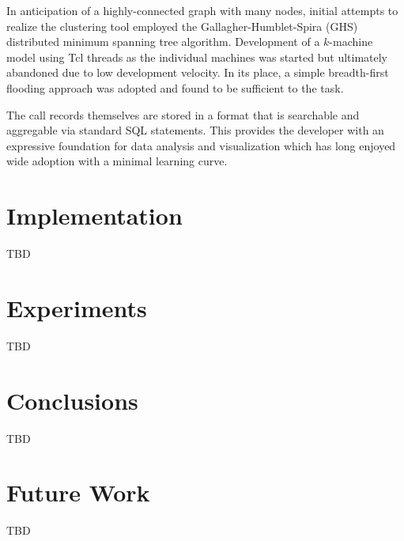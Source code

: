 \documentclass{article}[letter,10pt]
\begin{document}
{{    In anticipation of a highly-connected graph with many nodes, initial attempts
    to realize the clustering tool employed the Gallagher-Humblet-Spira (GHS) distributed
    minimum spanning tree algorithm\autocite[102-106]{DNA}. Development of a $k$-machine
    model\autocite[129-133]{DNA} using Tcl threads as the individual machines was started but ultimately
    abandoned due to low development velocity. In its place, a simple breadth-first
    flooding approach\autocite[55-58]{DNA} was adopted and found to be sufficient to the task.

    The call records themselves are stored in a format that is searchable and aggregable
    via standard SQL statements. This provides the developer with an expressive foundation
    for data analysis and visualization which has long enjoyed wide adoption with a
    minimal learning curve.
  }
}

\section{Implementation}{
  TBD
}

\section{Experiments}{
  TBD
}

\section{Conclusions}{
  TBD
}

\section{Future Work}{
  TBD
}

\printbibliography
\end{document}
